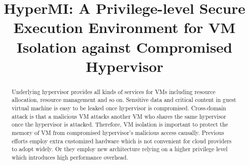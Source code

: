 \documentclass[conference]{IEEEtran}
\begin{document}
\title{HyperMI: A Privilege-level Secure Execution Environment for VM Isolation against Compromised Hypervisor}
\author{%


}

\maketitle

\begin{abstract}

Underlying hypervisor provides all kinds of services for VMs including resource allocation, resource management and so on. Sensitive data and critical content in guest virtual machine is easy to be leaked once hypervisor is compromised. 
Cross-domain attack is that a malicious VM attacks another VM who shares the same hypervisor once the hypervisor is attacked. Therefore, VM isolation is important to protect the memory of VM from compromised hypervisor's malicious access causally. Previous efforts employ extra customized hardware which is not convenient for cloud providers to adopt widely. Or they employ new architecture relying on a higher privilege level which introduces high performance overhead.


\end{abstract}
\end{document}
